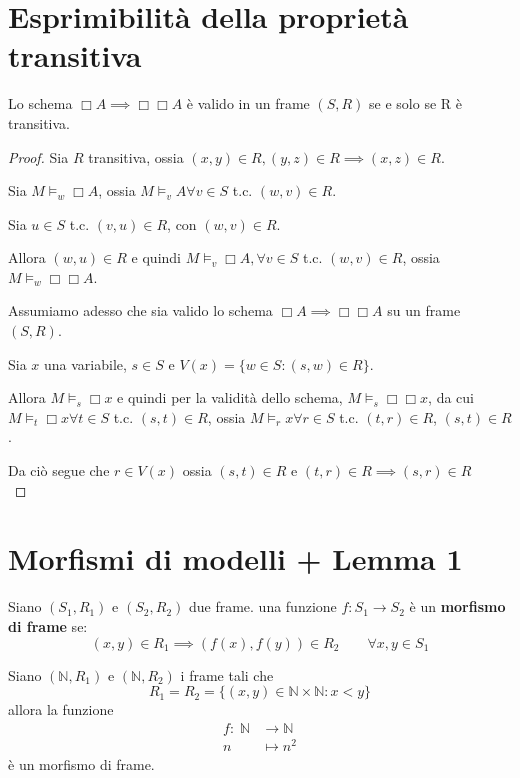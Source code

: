 \documentclass[10pt,a4paper,twoside]{book}
\begin{document}
\section{Esprimibilità della proprietà transitiva}
\begin{theorem}
    Lo schema $\Box A \implies \Box \Box A$ è valido in un frame $(S,R)$ se e solo se R è transitiva.
\end{theorem}
\begin{proof}
    Sia $R$ transitiva, ossia $(x,y) \in R, (y,z) \in R \implies (x,z) \in R$.

    Sia $M \vDash_w \Box A$, ossia $M \vDash_v A \forall v \in S$ t.c. $(w,v) \in R$.

    Sia $u \in S$ t.c. $(v,u) \in R$, con $(w,v) \in R$.

    Allora $(w,u) \in R$ e quindi $M \vDash_v \Box A, \forall v \in S$ t.c. $(w,v) \in R$, ossia $M \vDash_w \Box \Box A$.

    Assumiamo adesso che sia valido lo schema $\Box A \implies \Box \Box A$ su un frame $(S,R)$.

    Sia $x$ una variabile, $s \in S$ e $V(x) = \{w \in S : (s,w) \in R\}$.

    Allora $M \vDash_s \Box x$ e quindi per la validità dello schema, $M \vDash_s \Box \Box x $, da cui $M \vDash_t \Box x \forall t \in S$ t.c. $(s,t) \in R$, ossia $M \vDash_r x \forall r \in S$ t.c. $(t,r) \in R$, $(s,t) \in R$.

    Da ciò segue che $r \in V(x)$ ossia $(s,t) \in R$ e $(t,r) \in R \implies (s,r) \in R$\\
\end{proof}
\newpage

\section{Morfismi di modelli + Lemma 1}
\begin{definition}
    Siano $(S_1, R_1)$ e $(S_2, R_2)$ due frame. una funzione $f : S_1 \rightarrow S_2$ è un \textbf{morfismo di frame} se:
    \begin{equation*}
        (x,y)\in R_1 \implies (f(x), f(y)) \in R_2 \qquad \forall x,y \in S_1
    \end{equation*}
\end{definition}
\begin{example}
    Siano $(\mathbb{N}, R_1)$ e $(\mathbb{N}, R_2)$ i frame tali che
    \begin{equation*}
        R_1 = R_2 = \{(x,y) \in \mathbb{N} \times \mathbb{N} : x < y\}
    \end{equation*}
    allora la funzione
    \begin{align*}
        f : \; \mathbb{N} & \rightarrow \mathbb{N} \\
        n                 & \mapsto n^2
    \end{align*}
    è un morfismo di frame.
\end{example}
\end{document}
